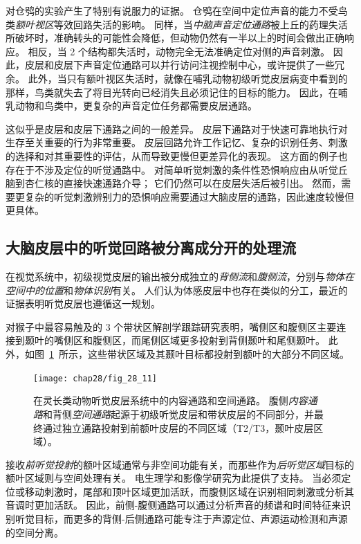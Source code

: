 对仓鸮的实验产生了特别有说服力的证据。
仓鸮在空间中定位声音的能力不受鸟类\textit{额叶视区}等效回路失活的影响。
同样，当\textit{中脑声音定位通路}被上丘的药理失活所破坏时，准确转头的可能性会降低，但动物仍然有一半以上的时间会做出正确响应。
相反，当 2 个结构都失活时，动物完全无法准确定位对侧的声音刺激。
因此，皮层和皮层下声音定位通路可以并行访问注视控制中心，或许提供了一些冗余。
此外，当只有额叶视区失活时，就像在哺乳动物初级听觉皮层病变中看到的那样，鸟类就失去了将目光转向已经消失且必须记住的目标的能力。
因此，在哺乳动物和鸟类中，更复杂的声音定位任务都需要皮层通路。


这似乎是皮层和皮层下通路之间的一般差异。
皮层下通路对于快速可靠地执行对生存至关重要的行为非常重要。
皮层回路允许工作记忆、复杂的识别任务、刺激的选择和对其重要性的评估，从而导致更慢但更差异化的表现。
这方面的例子也存在于不涉及定位的听觉通路中。
对简单听觉刺激的条件性恐惧响应由从听觉丘脑到杏仁核的直接快速通路介导；
它们仍然可以在皮层失活后被引出。
然而，需要更复杂的听觉刺激辨别力的恐惧响应需要通过大脑皮层的通路，因此速度较慢但更具体。



\subsection{大脑皮层中的听觉回路被分离成分开的处理流}

在视觉系统中，初级视觉皮层的输出被分成独立的\textit{背侧流}和\textit{腹侧流}，分别与\textit{物体在空间中的位置}和\textit{物体识别}有关。
人们认为体感皮层中也存在类似的分工，最近的证据表明听觉皮层也遵循这一规划。


对猴子中最容易触及的 3 个带状区解剖学跟踪研究表明，嘴侧区和腹侧区主要连接到颞叶的嘴侧区和腹侧区，而尾侧区域更多投射到背侧颞叶和尾侧颞叶。
此外，如图~\ref{fig:28_11}~所示，这些带状区域及其颞叶目标都投射到额叶的大部分不同区域。


\begin{figure}[htbp]
	\centering
	\texttt{[image: chap28/fig\_28\_11]}
	\caption{在灵长类动物听觉皮层系统中的内容通路和空间通路。
	腹侧\textit{内容通路}和背侧\textit{空间通路}起源于初级听觉皮层和带状皮层的不同部分，并最终通过独立通路投射到前额叶皮层的不同区域\cite{rauschecker2000mechanisms}（T2/T3，颞叶皮层区域）。}
	\label{fig:28_11}
\end{figure}


接收\textit{前听觉投射}的额叶区域通常与非空间功能有关，而那些作为\textit{后听觉区域}目标的额叶区域则与空间处理有关。
电生理学和影像学研究为此提供了支持。
当必须定位或移动刺激时，尾部和顶叶区域更加活跃，而腹侧区域在识别相同刺激或分析其音调时更加活跃。
因此，前侧-腹侧通路可以通过分析声音的频谱和时间特征来识别听觉目标，而更多的背侧-后侧通路可能专注于声源定位、声源运动检测和声源的空间分离。


